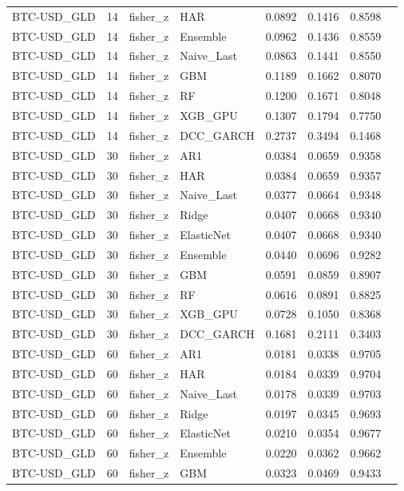 \begin{table}[H]
\begin{tabular}{llllrrrr}
BTC-USD_GLD & 14 & fisher_z & HAR & 0.0892 & 0.1416 & 0.8598 &  \\
BTC-USD_GLD & 14 & fisher_z & Ensemble & 0.0962 & 0.1436 & 0.8559 &  \\
BTC-USD_GLD & 14 & fisher_z & Naive_Last & 0.0863 & 0.1441 & 0.8550 &  \\
BTC-USD_GLD & 14 & fisher_z & GBM & 0.1189 & 0.1662 & 0.8070 &  \\
BTC-USD_GLD & 14 & fisher_z & RF & 0.1200 & 0.1671 & 0.8048 &  \\
BTC-USD_GLD & 14 & fisher_z & XGB_GPU & 0.1307 & 0.1794 & 0.7750 &  \\
BTC-USD_GLD & 14 & fisher_z & DCC_GARCH & 0.2737 & 0.3494 & 0.1468 &  \\
BTC-USD_GLD & 30 & fisher_z & AR1 & 0.0384 & 0.0659 & 0.9358 &  \\
BTC-USD_GLD & 30 & fisher_z & HAR & 0.0384 & 0.0659 & 0.9357 &  \\
BTC-USD_GLD & 30 & fisher_z & Naive_Last & 0.0377 & 0.0664 & 0.9348 &  \\
BTC-USD_GLD & 30 & fisher_z & Ridge & 0.0407 & 0.0668 & 0.9340 &  \\
BTC-USD_GLD & 30 & fisher_z & ElasticNet & 0.0407 & 0.0668 & 0.9340 &  \\
BTC-USD_GLD & 30 & fisher_z & Ensemble & 0.0440 & 0.0696 & 0.9282 &  \\
BTC-USD_GLD & 30 & fisher_z & GBM & 0.0591 & 0.0859 & 0.8907 &  \\
BTC-USD_GLD & 30 & fisher_z & RF & 0.0616 & 0.0891 & 0.8825 &  \\
BTC-USD_GLD & 30 & fisher_z & XGB_GPU & 0.0728 & 0.1050 & 0.8368 &  \\
BTC-USD_GLD & 30 & fisher_z & DCC_GARCH & 0.1681 & 0.2111 & 0.3403 &  \\
BTC-USD_GLD & 60 & fisher_z & AR1 & 0.0181 & 0.0338 & 0.9705 &  \\
BTC-USD_GLD & 60 & fisher_z & HAR & 0.0184 & 0.0339 & 0.9704 &  \\
BTC-USD_GLD & 60 & fisher_z & Naive_Last & 0.0178 & 0.0339 & 0.9703 &  \\
BTC-USD_GLD & 60 & fisher_z & Ridge & 0.0197 & 0.0345 & 0.9693 &  \\
BTC-USD_GLD & 60 & fisher_z & ElasticNet & 0.0210 & 0.0354 & 0.9677 &  \\
BTC-USD_GLD & 60 & fisher_z & Ensemble & 0.0220 & 0.0362 & 0.9662 &  \\
BTC-USD_GLD & 60 & fisher_z & GBM & 0.0323 & 0.0469 & 0.9433 &  \\

\end{tabular}
\end{table}
